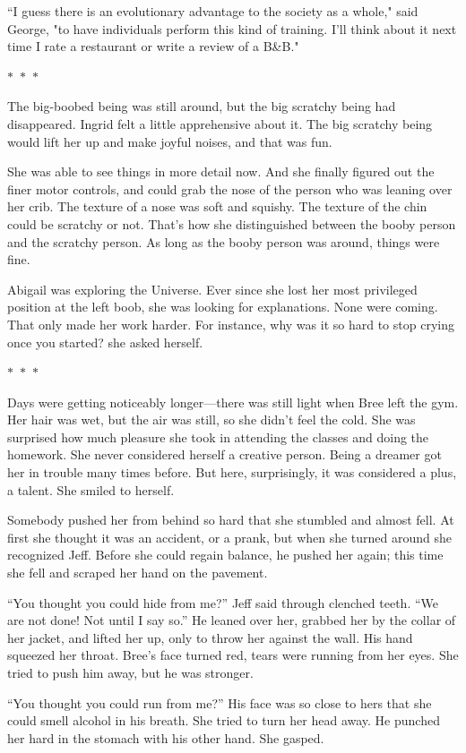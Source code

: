 \documentclass{memoir}
\newcommand{\starbreak}{%
\begin{center}
  $\ast$~$\ast$~$\ast$
\end{center}
}
\begin{document}
``I guess there is an evolutionary advantage to the society as a whole," said George, "to have individuals perform this kind of training. I'll think about it next time I rate a restaurant or write a review of a B\&B."


\starbreak

The big-boobed being was still around, but the big scratchy being had disappeared. Ingrid felt a little apprehensive about it. The big scratchy being would lift her up and make joyful noises, and that was fun. 

She was able to see things in more detail now. And she finally figured out the finer motor controls, and could grab the nose of the person who was leaning over her crib. The texture of a nose was soft and squishy. The texture of the chin could be scratchy or not. That's how she distinguished between the booby person and the scratchy person. As long as the booby person was around, things were fine.

Abigail was exploring the Universe. Ever since she lost her most privileged position at the left boob, she was looking for explanations. None were coming. That only made her work harder. For instance, why was it so hard to stop crying once you started? she asked herself.

\starbreak

Days were getting noticeably longer---there was still light when Bree left the gym. Her hair was wet, but the air was still, so she didn't feel the cold. She was surprised how much pleasure she took in attending the classes and doing the homework. She never considered herself a creative person. Being a dreamer got her in trouble many times before. But here, surprisingly, it was considered a plus, a talent. She smiled to herself.
 
Somebody pushed her from behind so hard that she stumbled and almost fell. At first she thought it was an accident, or a prank, but when she turned around she recognized Jeff. Before she could regain balance, he pushed her again; this time she fell and scraped her hand on the pavement. 

``You thought you could hide from me?'' Jeff said through clenched teeth. ``We are not done! Not until I say so.'' He leaned over her, grabbed her by the collar of her jacket, and lifted her up, only to throw her against the wall. His hand squeezed her throat. Bree's face turned red, tears were running from her eyes. She tried to push him away, but he was stronger. 

``You thought you could run from me?'' His face was so close to hers that she could smell alcohol in his breath. She tried to turn her head away. He punched her hard in the stomach with his other hand. She gasped. 
\end{document}
